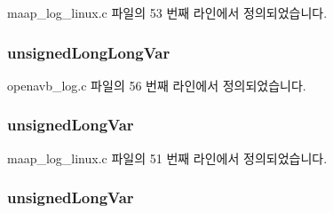 maap\+\_\+log\+\_\+linux.\+c 파일의 53 번째 라인에서 정의되었습니다.

\subsubsection[{\texorpdfstring{unsigned\+Long\+Long\+Var}{unsignedLongLongVar}}]{ unsigned\+Long\+Long\+Var}\hypertarget{structlog__rt__queue__item__t_a9ecdee09e96c0404077dc8723bbd8b30}{}\label{structlog__rt__queue__item__t_a9ecdee09e96c0404077dc8723bbd8b30}


openavb\+\_\+log.\+c 파일의 56 번째 라인에서 정의되었습니다.

\subsubsection[{\texorpdfstring{unsigned\+Long\+Var}{unsignedLongVar}}]{ unsigned\+Long\+Var}\hypertarget{structlog__rt__queue__item__t_aa8ae3bfcb3e941363e128eba96d09bee}{}\label{structlog__rt__queue__item__t_aa8ae3bfcb3e941363e128eba96d09bee}


maap\+\_\+log\+\_\+linux.\+c 파일의 51 번째 라인에서 정의되었습니다.

\subsubsection[{\texorpdfstring{unsigned\+Long\+Var}{unsignedLongVar}}]{ unsigned\+Long\+Var}\hypertarget{structlog__rt__queue__item__t_afc635ba0336fa2c6b55f3ad3d0f18efc}{}\label{structlog__rt__queue__item__t_afc635ba0336fa2c6b55f3ad3d0f18efc}


